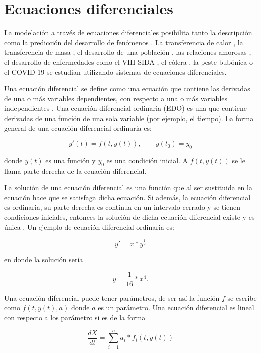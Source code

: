 \section{Ecuaciones diferenciales}\label{section:differential_equation_lineal_in_params}

La modelación a través de ecuaciones diferenciales posibilita tanto la descripción como la predicción del desarrollo de fenómenos \cite{zill2012first}. La transferencia de calor \cite{p-transferencia-calor}, la transferencia de masa \cite{p-transferencia-masa}, el desarrollo de una población \cite{p-desarrollo-poblacion}, las relaciones amorosas \cite{p-amor}, el desarrollo de enfermedades como el VIH-SIDA \cite{p-desarrollo-vih}, el cólera \cite{p-desarrollo-colera}, la peste bubónica \cite{p-desarrollo-peste} o el COVID-19 \cite{p-desarrollo-covid} se estudian utilizando sistemas de ecuaciones diferenciales.

Una ecuación diferencial se define como una ecuación que contiene las derivadas de una o más variables dependientes, con respecto a una o más variables independientes \cite{gaucel2014learning}. Una ecuación diferencial ordinaria (EDO) es una que contiene derivadas de una función de una sola variable (por ejemplo, el tiempo). La forma general de una ecuación diferencial ordinaria es:

$$y'(t)=f(t, y(t)), \qquad y(t_0) = y_0$$

donde $y(t)$ es una función y $y_0$ es una condición inicial. A $f(t, y(t))$ se le llama parte derecha de la ecuación diferencial.

La solución de una ecuación diferencial es una función que al ser sustituida en la ecuación hace que se satisfaga dicha ecuación. Si además, la ecuación diferencial es ordinaria, su parte derecha es continua en un intervalo cerrado y se tienen condiciones iniciales, entonces la solución de dicha ecuación diferencial existe y es única \cite{zill2012first}. Un ejemplo de ecuación diferencial ordinaria es:

$$y' = x * y^{\frac{1}{2}}$$

en donde la solución sería

$$y = \frac{1}{16} * x^4.$$

Una ecuación diferencial puede tener parámetros, de ser así la función $f$ se escribe como $f(t, y(t), a)$ donde $a$ es un parámetro. Una ecuación diferencial es lineal con respecto a los parámetro si es de la forma

$$\frac{dX}{dt} = \sum_{i=1}^{n} a_i * f_i(t, y(t))$$

